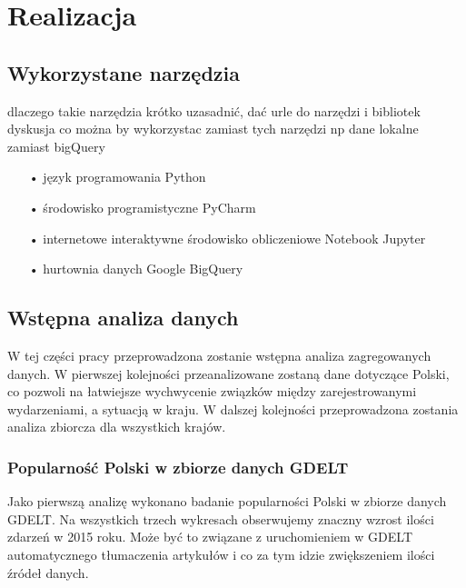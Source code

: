 \documentclass[11pt]{report}
\begin{document}
    \chapter{Realizacja}


    \section{Wykorzystane narzędzia}
    dlaczego takie narzędzia
    krótko uzasadnić, dać urle do narzędzi i bibliotek
    dyskusja co można by wykorzystac zamiast tych narzędzi np dane lokalne zamiast bigQuery
    \begin{enumerate}
        \item[•] język programowania Python
        \item[•] środowisko programistyczne PyCharm
        \item[•] internetowe interaktywne środowisko obliczeniowe Notebook Jupyter
        \item[•] hurtownia danych Google BigQuery
    \end{enumerate}


    \section{Wstępna analiza danych}
    W tej części pracy przeprowadzona zostanie wstępna analiza zagregowanych danych. W pierwszej kolejności przeanalizowane zostaną dane dotyczące Polski, co pozwoli na łatwiejsze wychwycenie związków między zarejestrowanymi wydarzeniami, a sytuacją w kraju.
    W dalszej kolejności przeprowadzona zostania analiza zbiorcza dla wszystkich krajów.

    \subsection{Popularność Polski w zbiorze danych GDELT}
    Jako pierwszą analizę wykonano badanie popularności Polski w zbiorze danych GDELT. Na wszystkich trzech wykresach obserwujemy znaczny wzrost ilości zdarzeń w 2015 roku. Może być to związane z uruchomieniem w GDELT automatycznego tłumaczenia artykułów i co za tym idzie zwiększeniem ilości źródeł danych.
\end{document}
